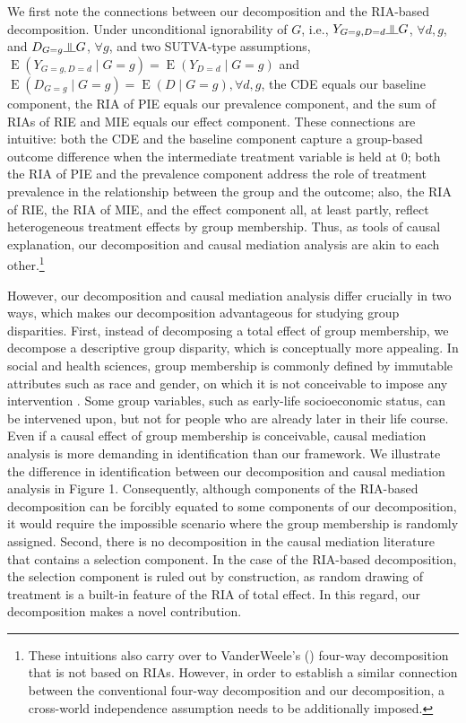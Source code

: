 \documentclass[12pt,a4paper]{article}
\newcommand{\indep}{\rotatebox[origin=c]{90}{$\models$}}  %
\newcommand{\E}{\operatorname{E}}
\begin{document}
We first note the connections between our decomposition and the RIA-based decomposition. 
Under unconditional ignorability of $G$, i.e., $Y_{G=g,D=d} \indep G$, $\forall d,g$, and $D_{G=g} \indep G$, $\forall g$, and two SUTVA-type assumptions, $\E(Y_{G=g,D=d} \mid  G=g)=\E(Y_{D=d} \mid  G=g)$ and $\E(D_{G=g} \mid  G=g)=\E(D \mid  G=g), \forall d,g$, the CDE equals our baseline component, the RIA of PIE equals our prevalence component, and the sum of RIAs of RIE and MIE equals our effect component. These connections are intuitive: both the CDE and the baseline component capture a group-based outcome difference when the intermediate treatment variable is held at $0$; both the RIA of PIE and the prevalence component address the role of treatment prevalence in the relationship between the group and the outcome; also, the RIA of RIE, the RIA of MIE, and the effect component all, at least partly, reflect heterogeneous treatment effects by group membership. Thus, as tools of causal explanation, our decomposition and causal mediation analysis are akin to each other.\footnote{These intuitions also carry over to VanderWeele's (\citeyear{vanderweele_unification_2014}) four-way decomposition that is not based on RIAs. However, in order to establish a similar connection between the conventional four-way decomposition and our decomposition, a cross-world independence assumption needs to be additionally imposed.}

However, our decomposition and causal mediation analysis differ crucially in two ways, which makes our decomposition advantageous for studying group disparities. First, instead of decomposing a total effect of group membership, we decompose a descriptive group disparity, which is conceptually more appealing. In social and health sciences, group membership is commonly defined by immutable attributes such as race and gender, on which it is not conceivable to impose any intervention \citep{rubin_estimating_1974, holland_statistics_1986, berzuini_causal_2012}. Some group variables, such as early-life socioeconomic status, can be intervened upon, but not for people who are already later in their life course. Even if a causal effect of group membership is conceivable, causal mediation analysis is more demanding in identification than our framework. We illustrate the difference in identification between our decomposition and causal mediation analysis in Figure 1. Consequently, although components of the RIA-based decomposition can be forcibly equated to some components of our decomposition, it would require the impossible scenario where the group membership is randomly assigned.
Second, there is no decomposition in the causal mediation literature that contains a selection component. In the case of the RIA-based decomposition, the selection component is ruled out by construction, as random drawing of treatment is a built-in feature of the RIA of total effect. In this regard, our decomposition makes a novel contribution.
\end{document}

